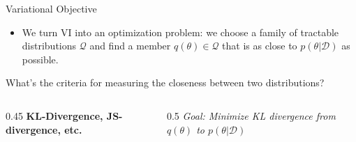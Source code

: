 \documentclass[aspectratio=169,xcolor=dvipsnames,svgnames,x11names,fleqn]{beamer}
\begin{document}
\begin{frame}{Variational Objective}


\footnotesize

    \begin{itemize}
        \item[] We turn VI into an optimization problem: we choose a family of tractable distributions $\mathcal{Q}$ and find a member $q(\theta) \in \mathcal{Q}$ that is as close to $p(\theta|\mathcal{D})$ as possible.
    \end{itemize}

    \begin{tcolorbox}[colback=gray!5, colframe=gray!30, boxrule=0.5pt, size=small]
        \centering \small What's the criteria for measuring the closeness between two distributions?
    \end{tcolorbox}

    \pause
    \begin{columns}
        \begin{column}{0.45\textwidth}
            \textbf{KL-Divergence, JS-divergence, etc.}
        \end{column}
        \begin{column}{0.5\textwidth}
             \textit{Goal: Minimize KL divergence from $q(\theta)$ to $p(\theta|\mathcal{D})$}
        \end{column}
    \end{columns}
    
\end{frame}
\end{document}
